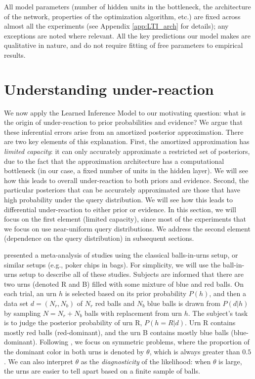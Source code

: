 All model parameters (number of hidden units in the bottleneck, the architecture of the network, properties of the optimization algorithm, etc.) are fixed across almost all the experiments (see Appendix \ref{app:LTI_arch} for details); any exceptions are noted where relevant. All the key predictions our model makes are qualitative in nature, and do not require fitting of free parameters to empirical results.

\section{Understanding under-reaction}

We now apply the Learned Inference Model to our motivating question: what is the origin of under-reaction to prior probabilities and evidence? We argue that these inferential errors arise from an amortized posterior approximation. There are two key elements of this explanation. First, the amortized approximation has \emph{limited capacity}: it can only accurately approximate a restricted set of posteriors, due to the fact that the approximation architecture has a computational bottleneck (in our case, a fixed number of units in the hidden layer). We will see how this leads to overall under-reaction to both priors and evidence. Second, the particular posteriors that can be accurately approximated are those that have high probability under the query distribution. We will see how this leads to differential under-reaction to either prior or evidence. In this section, we will focus on the first element (limited capacity), since most of the experiments that we focus on use near-uniform query distributions. We address the second element (dependence on the query distribution) in subsequent sections.

\citet{benjamin18} presented a meta-analysis of studies using the classical balls-in-urns setup, or similar setups (e.g., poker chips in bags). For simplicity, we will use the ball-in-urns setup to describe all of these studies. Subjects are informed that there are two urns (denoted R and B) filled with some mixture of blue and red balls. On each trial, an urn $h$ is selected based on its prior probability $P(h)$, and then a data set $d = (N_r,N_b)$ of $N_r$ red balls and $N_b$ blue balls is drawn from $P(d|h)$ by sampling $N = N_r+N_b$ balls with replacement from urn $h$. The subject's task is to judge the posterior probability of urn R, $P(h=R|d)$. Urn R contains mostly red balls (red-dominant), and the urn B contains mostly blue balls (blue-dominant). Following \citet{benjamin18}, we focus on symmetric problems, where the proportion of the dominant color in both urns is denoted by $\theta$, which is always greater than $0.5$. We can also interpret $\theta$ as the \emph{diagnosticity} of the likelihood: when $\theta$ is large, the urns are easier to tell apart based on a finite sample of balls.

